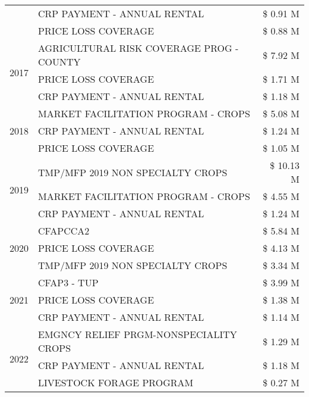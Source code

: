 \begin{tabular}{llr}
 & CRP PAYMENT - ANNUAL RENTAL & \$ 0.91 M \\
 & PRICE LOSS COVERAGE & \$ 0.88 M \\
\cline{1-3}
\multirow[t]{3}{*}{2017} & AGRICULTURAL RISK COVERAGE PROG - COUNTY & \$ 7.92 M \\
 & PRICE LOSS COVERAGE & \$ 1.71 M \\
 & CRP PAYMENT - ANNUAL RENTAL & \$ 1.18 M \\
\cline{1-3}
\multirow[t]{3}{*}{2018} & MARKET FACILITATION PROGRAM - CROPS & \$ 5.08 M \\
 & CRP PAYMENT - ANNUAL RENTAL & \$ 1.24 M \\
 & PRICE LOSS COVERAGE & \$ 1.05 M \\
\cline{1-3}
\multirow[t]{3}{*}{2019} & TMP/MFP 2019 NON SPECIALTY CROPS & \$ 10.13 M \\
 & MARKET FACILITATION PROGRAM - CROPS & \$ 4.55 M \\
 & CRP PAYMENT - ANNUAL RENTAL & \$ 1.24 M \\
\cline{1-3}
\multirow[t]{3}{*}{2020} & CFAPCCA2 & \$ 5.84 M \\
 & PRICE LOSS COVERAGE & \$ 4.13 M \\
 & TMP/MFP 2019 NON SPECIALTY CROPS & \$ 3.34 M \\
\cline{1-3}
\multirow[t]{3}{*}{2021} & CFAP3 - TUP & \$ 3.99 M \\
 & PRICE LOSS COVERAGE & \$ 1.38 M \\
 & CRP PAYMENT - ANNUAL RENTAL & \$ 1.14 M \\
\cline{1-3}
\multirow[t]{3}{*}{2022} & EMGNCY RELIEF PRGM-NONSPECIALITY CROPS & \$ 1.29 M \\
 & CRP PAYMENT - ANNUAL RENTAL & \$ 1.18 M \\
 & LIVESTOCK FORAGE PROGRAM & \$ 0.27 M \\
\cline{1-3}
\bottomrule
\end{tabular}
